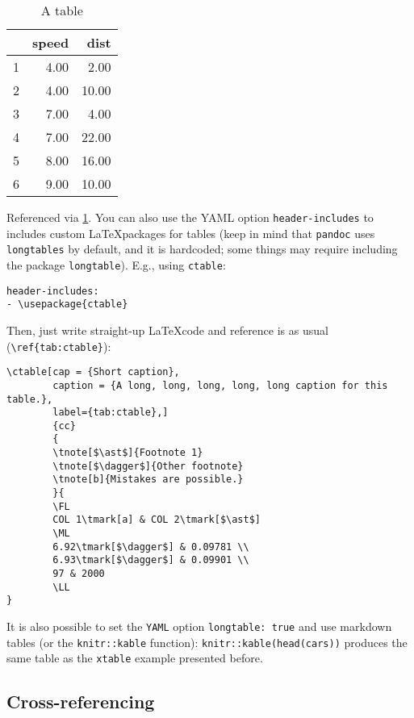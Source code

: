 \documentclass[AMA,STIX1COL,]{WileyNJD-v2}
\begin{document}
\begin{table}[ht]
\centering
\begin{tabular}{rrr}
  \hline
 & speed & dist \\ 
  \hline
1 & 4.00 & 2.00 \\ 
  2 & 4.00 & 10.00 \\ 
  3 & 7.00 & 4.00 \\ 
  4 & 7.00 & 22.00 \\ 
  5 & 8.00 & 16.00 \\ 
  6 & 9.00 & 10.00 \\ 
   \hline
\end{tabular}
\caption{A table} 
\label{tab:table}
\end{table}

Referenced via \ref{tab:table}. You can also use the YAML option
\texttt{header-includes} to includes custom \LaTeX packages for tables
(keep in mind that \texttt{pandoc} uses \texttt{longtables} by default,
and it is hardcoded; some things may require including the package
\texttt{longtable}). E.g., using \texttt{ctable}:

\begin{verbatim}
header-includes:
- \usepackage{ctable}
\end{verbatim}

Then, just write straight-up \LaTeX code and reference is as usual
(\texttt{\textbackslash{}ref\{tab:ctable\}}):

\begin{verbatim}
\ctable[cap = {Short caption},
        caption = {A long, long, long, long, long caption for this table.},
        label={tab:ctable},]
        {cc}
        {
        \tnote[$\ast$]{Footnote 1}
        \tnote[$\dagger$]{Other footnote}
        \tnote[b]{Mistakes are possible.}
        }{
        \FL
        COL 1\tmark[a] & COL 2\tmark[$\ast$]
        \ML
        6.92\tmark[$\dagger$] & 0.09781 \\
        6.93\tmark[$\dagger$] & 0.09901 \\
        97 & 2000
        \LL
}
\end{verbatim}

It is also possible to set the \texttt{YAML} option
\texttt{longtable:\ true} and use markdown tables (or the
\texttt{knitr::kable} function): \texttt{knitr::kable(head(cars))}
produces the same table as the \texttt{xtable} example presented before.

\hypertarget{cross-referencing}{%
\subsection{Cross-referencing}\label{cross-referencing}}
\end{document}
